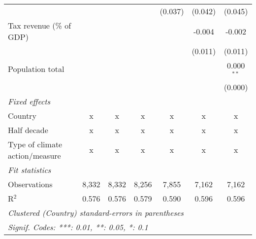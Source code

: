 \begin{tabular}{lcccccc}
                                                           &         &               &               & (0.037)       & (0.042)       & (0.045)\\   
   Tax revenue (\% of GDP)                                 &         &               &               &               & -0.004        & -0.002\\   
                                                           &         &               &               &               & (0.011)       & (0.011)\\   
   Population total                                        &         &               &               &               &               & 0.000$^{**}$\\   
                                                           &         &               &               &               &               & (0.000)\\   
   \emph{Fixed effects}\\
   Country                                                 & x       & x             & x             & x             & x             & x\\  
   Half decade                                             & x       & x             & x             & x             & x             & x\\  
   Type of climate action/measure                          & x       & x             & x             & x             & x             & x\\  
   \midrule \emph{Fit statistics}\\
   Observations                                            & 8,332   & 8,332         & 8,256         & 7,855         & 7,162         & 7,162\\  
   R$^2$                                                   & 0.576   & 0.576         & 0.579         & 0.590         & 0.596         & 0.596\\  
   \midrule
   \multicolumn{7}{l}{\emph{Clustered (Country) standard-errors in parentheses}}\\
   \multicolumn{7}{l}{\emph{Signif. Codes: ***: 0.01, **: 0.05, *: 0.1}}\\
\end{tabular}
\par\endgroup


